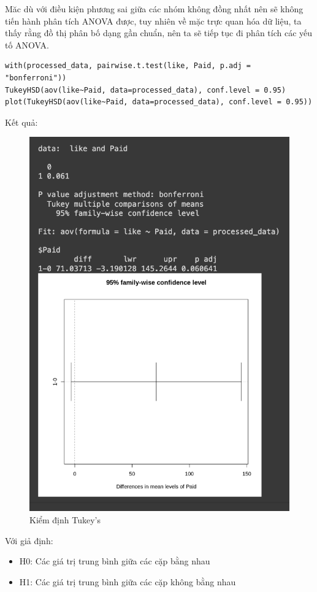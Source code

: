 \begin{itemize}
\begin{itemize}
Măc dù với điều kiện phương sai giữa các nhóm không đồng nhất nên sẽ không tiến hành phân tích ANOVA được, tuy nhiên về mặc trực quan hóa dữ liệu, ta thấy rằng đồ thị phân bố dạng gần chuẩn, nên ta sẽ tiếp tục đi phân tích các yếu tố ANOVA.
\newpage

    \begin{lstlisting}
with(processed_data, pairwise.t.test(like, Paid, p.adj = "bonferroni"))
TukeyHSD(aov(like~Paid, data=processed_data), conf.level = 0.95)
plot(TukeyHSD(aov(like~Paid, data=processed_data), conf.level = 0.95))
    \end{lstlisting}
    Kết quả:
    \begin{figure}[H]
        \centering
        \includegraphics[width=0.8\linewidth]{part23_figures/17.png}
        \caption{Kiểm định Tukey's}
        \label{fig:Kiểm định Tukey's}
    \end{figure}
    Với giả định:
    \begin{itemize}
        \item H0: Các giá trị trung bình giữa các cặp bằng nhau
        \item H1: Các giá trị trung bình giữa các cặp không bằng nhau
    \end{itemize}

\end{itemize}
\end{itemize}

